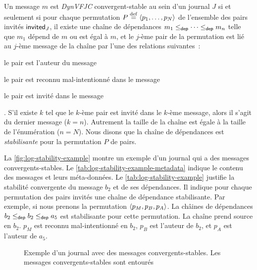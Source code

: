 Un message $m$ est \emph{DynVFJC} convergent-stable au sein d'un journal $J$ si et seulement si pour chaque permutation $P \defeq \tuple{p_1, \dotsc, p_N}$ de l'ensemble des pairs invités $\trm{invited}_J$, il existe une chaîne de dépendances $m_1 \depeq \dotsb \depeq m_n$ telle que $m_1$ dépend de $m$ ou est égal à $m$, et le $j$-ème pair de la permutation est lié au $j$-ème message de la chaîne par l'une des relations suivantes~: \begin{inlinelist}
    \item le pair est l'auteur du message
    \item le pair est reconnu mal-intentionné dans le message
    \item le pair est invité dans le message
\end{inlinelist}.
S'il existe $k$ tel que le $k$-ème pair est invité dans le $k$-ème message, alors il s'agit du dernier message ($k = n$).
Autrement la taille de la chaîne est égale à la taille de l'énumération ($n = N$).
Nous disons que la chaîne de dépendances est \emph{stabilisante} pour la permutation $P$ de pairs.

La \autoref{fig:log-stability-example} montre un exemple d'un journal qui a des messages convergents-stables.
Le \autoref{tab:log-stability-example-metadata} indique le contenu des messages et leurs méta-données.
Le \autoref{tab:log-stability-example} justifie la stabilité convergente du message $b_2$ et de ses dépendances.
Il indique pour chaque permutation des pairs invités une chaîne de dépendance stabilisante.
Par exemple, si nous prenons la permutation $\tuple*{p_M, p_B, p_A}$.
La châines de dépendances $b_2 \depeq b_2 \depeq a_5$ est stabilisante pour cette permutation.
La chaîne prend source en $b_2$.
$p_M$ est reconnu mal-intentionné en $b_2$, $p_B$ est l'auteur de $b_2$, et $p_A$ est l'auteur de $a_5$.


\begin{figure}[hbt]
\centering
{}
\caption[Exemple d'un journal avec des messages convergents-stables]{Exemple d'un journal avec des messages convergents-stables.
Les messages convergents-stables sont entourés}\label{fig:log-stability-example}
\end{figure}

